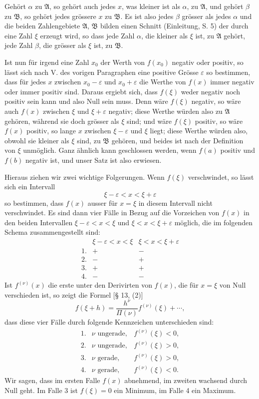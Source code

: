 \documentclass[11pt]{article}
\begin{document}
Gehört $\alpha$ zu $\mathfrak A$, so gehört auch jedes $x$, was kleiner ist als $\alpha$, zu $\mathfrak A$, und gehört $\beta$ zu $\mathfrak B$, so gehört jedes grössere $x$ zu $\mathfrak B$. Es ist also jedes $\beta$ grösser als jedes $\alpha$ und die beiden Zahlengebiete $\mathfrak A$, $\mathfrak B$ bilden einen Schnitt (Einleitung, S. 5) der durch eine Zahl $\xi$ erzeugt wird, so dass jede Zahl $\alpha$, die kleiner als $\xi$ ist, zu $\mathfrak A$ gehört, jede Zahl $\beta$, die grösser als $\xi$ ist, zu $\mathfrak B$.

Ist nun für irgend eine Zahl $x_0$ der Werth von $f(x_0)$ negativ oder positiv, so lässt sich nach V. des vorigen Paragraphen eine positive Grösse $\varepsilon$ so bestimmen, dass für jedes $x$ zwischen $x_0-\varepsilon$ und $x_0+\varepsilon$ die Werthe von $f(x)$ immer negativ oder immer positiv sind. Daraus ergiebt sich, dass $f(\xi)$ weder negativ noch positiv sein kann und also Null sein muss. Denn wäre $f(\xi)$ negativ, so wäre auch $f(x)$ zwischen $\xi$ und $\xi+\varepsilon$ negativ; diese Werthe würden also zu $\mathfrak A$ gehören, während sie doch grösser als $\xi$ sind; und wäre $f(\xi)$ positiv, so wäre $f(x)$ positiv, so lange $x$ zwischen $\xi-\varepsilon$ und $\xi$ liegt; diese Werthe würden also, obwohl sie kleiner als $\xi$ sind, zu $\mathfrak B$ gehören, und beides ist nach der Definition von $\xi$ unmöglich. Ganz ähnlich kann geschlossen werden, wenn $f(a)$ positiv und $f(b)$ negativ ist, und unser Satz ist also erwiesen.

Hieraus ziehen wir zwei wichtige Folgerungen. Wenn $f(\xi)$ verschwindet, so lässt sich ein Intervall
\[
 \xi-\varepsilon<x<\xi+\varepsilon
\]
so bestimmen, dass $f(x)$ ausser für $x=\xi$ in diesem Intervall nicht verschwindet. Es sind dann vier Fälle in Bezug auf die Vorzeichen von $f(x)$ in den beiden Intervallen $\xi-\varepsilon<x<\xi$ und $\xi<x<\xi+\varepsilon$ möglich, die im folgenden Schema zusammengestellt sind:
\[
\begin{array}{c|cc}
&\xi-\varepsilon<x<\xi&\xi<x<\xi+\varepsilon\\
1.&+&-\\
2.&-&+\\
3.&+&+\\
4.&-&-
\end{array}
\]
Ist $f^{(\nu)}(x)$ die erste unter den Derivirten von $f(x)$, die für $x=\xi$ von Null verschieden ist, so zeigt die Formel [§ 13, (2)]
\[
 f(\xi+h)=\frac{h^\nu}{\Pi(\nu)}f^{(\nu)}(\xi)+\cdots,
\]
dass diese vier Fälle durch folgende Kennzeichen unterschieden sind:
\[
\begin{array}{lll}
1.&\nu\text{ ungerade},& f^{(\nu)}(\xi)<0,\\
2.&\nu\text{ ungerade},& f^{(\nu)}(\xi)>0,\\
3.&\nu\text{ gerade},& f^{(\nu)}(\xi)>0,\\
4.&\nu\text{ gerade},& f^{(\nu)}(\xi)<0.
\end{array}
\]
Wir sagen, dass im ersten Falle $f(x)$ abnehmend, im zweiten wachsend durch Null geht. Im Falle 3 ist $f(\xi)=0$ ein Minimum, im Falle 4 ein Maximum.
\end{document}
